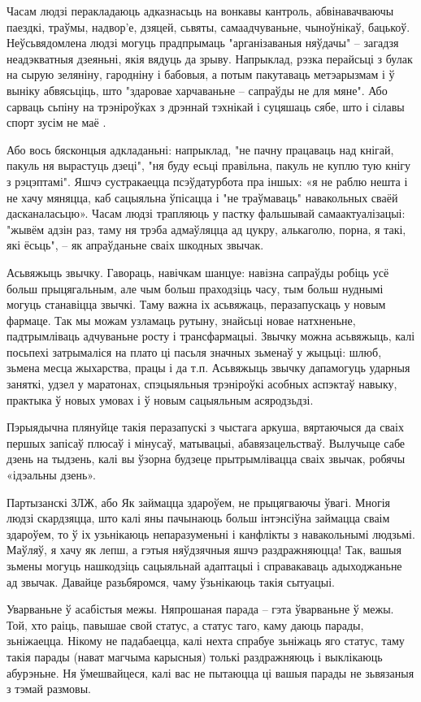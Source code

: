 Часам людзі перакладаюць адказнасьць на вонкавы кантроль, абвінавачваючы паездкі, траўмы, надвор'е, дзяцей, сьвяты, самаадчуваньне, чыноўнікаў, бацькоў. Неўсьвядомлена людзі могуць прадпрымаць "арганізаваныя няўдачы" – загадзя неадэкватныя дзеяньні, якія вядуць да зрыву. Напрыклад, рэзка перайсьці з булак на сырую зеляніну, гародніну і бабовыя, а потым пакутаваць метэарызмам і ў выніку абвясьціць, што "здаровае харчаваньне – сапраўды не для мяне". Або сарваць сьпіну на трэніроўках з дрэннай тэхнікай і суцяшаць сябе, што і сілавы спорт зусім не маё .

Або вось бясконцыя адкладаньні: напрыклад, "не пачну працаваць над кнігай, пакуль ня вырастуць дзеці", "ня буду есьці правільна, пакуль не куплю тую кнігу з рэцэптамі". Яшчэ сустракаецца псэўдатурбота пра іншых: «я не раблю нешта і не хачу мяняцца, каб сацыяльна ўпісацца і "не траўмаваць" навакольных сваёй дасканаласьцю». Часам людзі трапляюць у пастку фальшывай самаактуалізацыі: "жывём адзін раз, таму ня трэба адмаўляцца ад цукру, алькаголю, порна, я такі, які ёсьць", – як апраўданьне сваіх шкодных звычак.

Асьвяжыць звычку. Гавораць, навічкам шанцуе: навізна сапраўды робіць усё больш прыцягальным, але чым больш праходзіць часу, тым больш нуднымі могуць станавіцца звычкі. Таму важна іх асьвяжаць, перазапускаць у новым фармаце. Так мы можам узламаць рутыну, знайсьці новае натхненьне, падтрымліваць адчуваньне росту і трансфармацыі. Звычку можна асьвяжыць, калі посьпехі затрымаліся на плато ці пасьля значных зьменаў у жыцьці: шлюб, зьмена месца жыхарства, працы і да т.п. Асьвяжыць звычку дапамогуць ударныя заняткі, удзел у маратонах, спэцыяльныя трэніроўкі асобных аспэктаў навыку, практыка ў новых умовах і ў новым сацыяльным асяродзьдзі.

Пэрыядычна плянуйце такія перазапускі з чыстага аркуша, вяртаючыся да сваіх першых запісаў плюсаў і мінусаў, матывацыі, абавязацельстваў. Вылучыце сабе дзень на тыдзень, калі вы ўзорна будзеце прытрымлівацца сваіх звычак, робячы «ідэальны дзень».

Партызанскі ЗЛЖ, або Як займацца здароўем, не прыцягваючы ўвагі. Многія людзі скардзяцца, што калі яны пачынаюць больш інтэнсіўна займацца сваім здароўем, то ў іх узьнікаюць непаразуменьні і канфлікты з навакольнымі людзьмі. Маўляў, я хачу як лепш, а гэтыя няўдзячныя яшчэ раздражняюцца! Так, вашыя зьмены могуць нашкодзіць сацыяльнай адаптацыі і справакаваць адыходжаньне ад звычак. Давайце разьбяромся, чаму ўзьнікаюць такія сытуацыі.

Уварваньне ў асабістыя межы. Няпрошаная парада – гэта ўварваньне ў межы. Той, хто раіць, павышае свой статус, а статус таго, каму даюць парады, зьніжаецца. Нікому не падабаецца, калі нехта спрабуе зьніжаць яго статус, таму такія парады (нават магчыма карысныя) толькі раздражняюць і выклікаюць абурэньне. Ня ўмешвайцеся, калі вас не пытаюцца ці вашыя парады не зьвязаныя з тэмай размовы.

